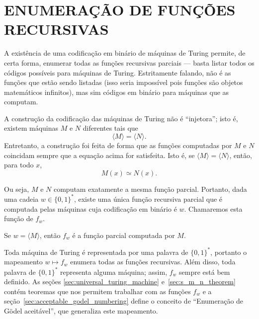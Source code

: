\section{ENUMERAÇÃO DE FUNÇÕES RECURSIVAS}
\label{sec:definition_enumeration_of_recursive_functions}

A existência de uma codificação em binário de máquinas de Turing
permite, de certa forma,
enumerar todas as funções recursivas parciais
--- basta listar todos os códigos possíveis para máquinas de Turing.
Estritamente falando,
não é as funções que estão sendo listadas
(isso seria impossível pois funções são objetos matemáticos infinitos),
mas sim códigos em binário para máquinas que as computam.

A construção da codificação das máquinas de Turing não é ``injetora'';
isto é, existem máquinas $M$ e $N$ diferentes
tais que
\begin{equation*}
    \langle M \rangle = \langle N \rangle.
\end{equation*}
Entretanto,
a construção foi feita de forma que
as funções computadas por $M$ e $N$ coincidam
sempre que a equação acima for satisfeita.
Isto é,
se $\langle M \rangle = \langle N \rangle$,
então, para todo $x$,
\begin{equation*}
    M(x) \simeq N(x).
\end{equation*}

Ou seja,
$M$ e $N$ computam exatamente a mesma função parcial.
Portanto,
dada uma cadeia $w \in \{0, 1\}^*$,
existe uma única função recursiva parcial
que é computada pelas máquinas cuja codificação em binário é $w$.
Chamaremos esta função de $f_w$.

\begin{notation}
    Se $w = \langle M \rangle$, então $f_w$ é a função parcial computada por $M$.
\end{notation}

Toda máquina de Turing é representada por uma palavra de $\{0, 1\}^*$,
portanto o mapeamento $w \mapsto f_w$
enumera todas as funções recursivas.
Além disso,
toda palavra de $\{0, 1\}^*$ representa alguma máquina;
assim, $f_w$ sempre está bem definido.
As seções \ref{sec:universal_turing_machine} e~\ref{sec:s_m_n_theorem}
contém teoremas que nos permitem trabalhar com as funções $f_w$
e a seção~\ref{sec:acceptable_godel_numbering}
define o conceito de ``Enumeração de Gödel aceitável'',
que generaliza este mapeamento.
